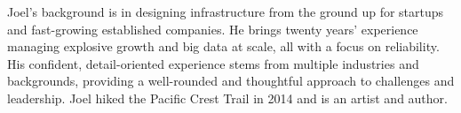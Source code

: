 %
%
%
\par{
Joel’s background is in designing infrastructure from the ground up for startups and fast-growing established companies. He brings twenty years’ experience managing explosive growth and big data at scale, all with a focus on reliability. His confident, detail-oriented experience stems from multiple industries and backgrounds, providing a well-rounded and thoughtful approach to challenges and leadership. Joel hiked the Pacific Crest Trail in 2014 and is an artist and author.
}